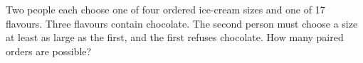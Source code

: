 Two people each choose one of four ordered ice-cream sizes and one of 17 flavours. Three flavours contain chocolate. The second person must choose a size at least as large as the first, and the first refuses chocolate. How many paired orders are possible?
